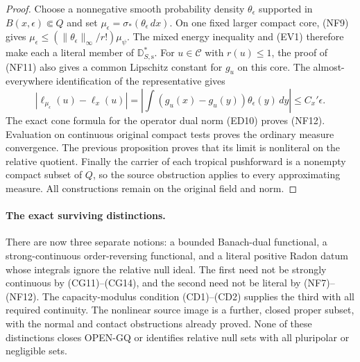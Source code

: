 \begin{proof}
Choose a nonnegative smooth probability density
$\theta_\epsilon$ supported in $B(x,\epsilon)\Subset Q$
and set $\mu_\epsilon=\sigma_*(\theta_\epsilon\,dx)$.
On one fixed larger compact core, (NF9) gives
$\mu_\epsilon\leq(\|\theta_\epsilon\|_\infty/r!)\mu_\psi$.
The mixed energy inequality and (EV1) therefore make
each a literal member of $\mathbb D_{S,\mathrm s}^*$.
For $u\in\mathscr C$ with $r(u)\leq1$, the proof of
(NF11) also gives a common Lipschitz constant for $g_u$
on this core. The almost-everywhere identification of the
representative gives
\[
 \left|\ell_{\mu_\epsilon}(u)-\ell_x(u)\right|
       =\left|\int(g_u(x)-g_u(y))\theta_\epsilon(y)\,dy\right|
       \leq C_x'\epsilon.
\]
The exact cone formula for the operator dual norm (ED10)
proves (NF12). Evaluation on continuous original compact
tests proves the ordinary measure convergence. The previous
proposition proves that its limit is nonliteral on the
relative quotient. Finally the carrier of each tropical
pushforward is a nonempty compact subset of $Q$, so the
source obstruction applies to every approximating measure.
All constructions remain on the original field and norm.
\end{proof}

\paragraph{The exact surviving distinctions.}
There are now three separate notions: a bounded Banach-dual
functional, a strong-continuous order-reversing functional,
and a literal positive Radon datum whose integrals ignore
the relative null ideal. The first need not be strongly
continuous by (CG11)--(CG14), and the second need not be
literal by (NF7)--(NF12). The capacity-modulus condition
(CD1)--(CD2) supplies the third with all required continuity.
The nonlinear source image is a further, closed proper subset,
with the normal and contact obstructions already proved.
None of these distinctions closes OPEN-GQ or identifies
relative null sets with all pluripolar or negligible sets.
